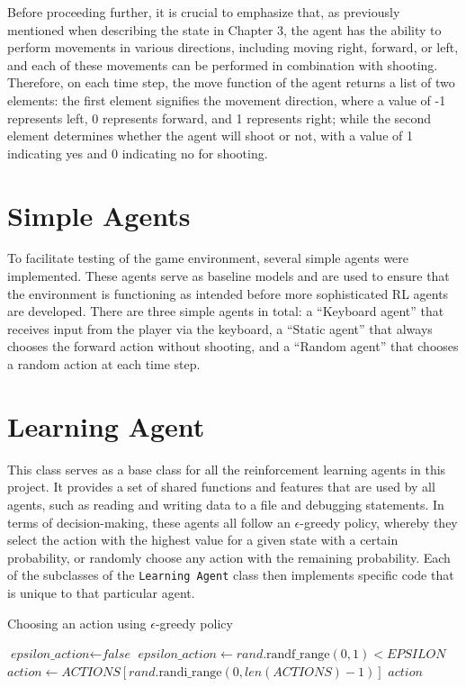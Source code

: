 Before proceeding further, it is crucial to emphasize that, as previously mentioned when describing the state in Chapter 3, the agent has the ability to perform movements in various directions, including moving right, forward, or left, and each of these movements can be performed in combination with shooting. Therefore, on each time step, the move function of the agent returns a list of two elements: the first element signifies the movement direction, where a value of -1 represents left, 0 represents forward, and 1 represents right; while the second element determines whether the agent will shoot or not, with a value of 1 indicating yes and 0 indicating no for shooting.


\section{Simple Agents}
To facilitate testing of the game environment, several simple agents were implemented. These agents serve as baseline models and are used to ensure that the environment is functioning as intended before more sophisticated RL agents are developed. There are three simple agents in total: a ``Keyboard agent'' that receives input from the player via the keyboard, a ``Static agent'' that always chooses the forward action without shooting, and a ``Random agent'' that chooses a random action at each time step. 

\section{Learning Agent}
This class serves as a base class for all the reinforcement learning agents in this project. It provides a set of shared functions and features that are used by all agents, such as reading and writing data to a file and debugging statements. In terms of decision-making, these agents all follow an $\epsilon$-greedy policy, whereby they select the action with the highest value for a given state with a certain probability, or randomly choose any action with the remaining probability. Each of the subclasses of the \texttt{Learning Agent} class then implements specific code that is unique to that particular agent.

\begin{algorithm}
\caption{Choosing an action using $\epsilon$-greedy policy}
\begin{algorithmic}[1]
    \State $\textit{epsilon\_action} \gets \textit{false}$
     
        \State $\textit{epsilon\_action} \gets rand.\text{randf\_range}(0,1) < EPSILON$
            \State $action \gets ACTIONS [rand.\text{randi\_range}(0,len(ACTIONS) - 1)]$  
        \EndIf
    \EndIf
    \State \Return $action$
\EndFunction
\end{algorithmic}
\end{algorithm}

